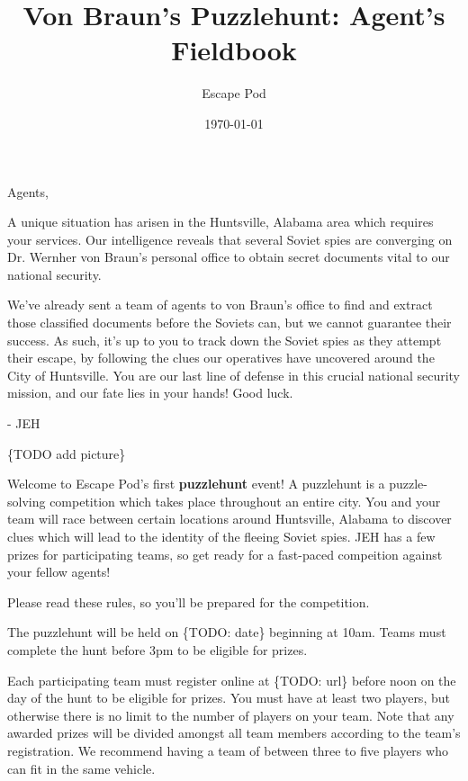 \documentclass{puzzlehunt}
\title{Von Braun's Puzzlehunt: Agent's Fieldbook}
\author{Escape Pod}
\date{\today}
\begin{document}
\frontmatter %

\phTitlePage %


\mainmatter %




\noindent Agents,

A unique situation has arisen in the Huntsville, Alabama area which requires
your services. Our intelligence reveals that several Soviet spies are converging
on Dr. Wernher von Braun's personal office to obtain secret documents vital to
our national security.

We've already sent a team of agents to von Braun's office to find and extract
those classified documents before the Soviets can, but we cannot guarantee
their success. As such, it's up to you to track down the Soviet spies as they
attempt their escape, by following the clues our operatives have uncovered
around the City of Huntsville. You are our last line of defense in this crucial
national security mission, and our fate lies in your hands! Good luck.

- JEH

\{TODO add picture\}


Welcome to Escape Pod's first \textbf{puzzlehunt} event! A puzzlehunt
is a puzzle-solving competition which takes place throughout an entire city.
You and your team will race between certain locations around Huntsville,
Alabama to discover clues
which will lead to the identity of the fleeing Soviet spies. JEH has a
few prizes for participating teams, so get ready for a fast-paced compeition
against your fellow agents!

Please read these rules, so you'll be prepared for the competition.


The puzzlehunt will be held on \{TODO: date\} beginning at 10am. Teams must
complete the hunt before 3pm to be eligible for prizes.


Each participating team must register online at \{TODO: url\} before noon
on the day of the hunt to be eligible for prizes. You must have at least two
players, but otherwise there is no limit to the
number of players on your team. Note that any awarded prizes will be divided amongst
all team members according to the team's registration. We recommend having
a team of between three to five players who can fit in the same vehicle.
\end{document}
